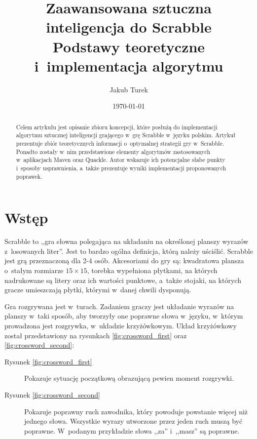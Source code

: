 \documentclass[a4paper,twocolumn,12pt]{article}
\title{\LARGE{Zaawansowana sztuczna inteligencja do Scrabble} \\ \vspace{2mm} \large{Podstawy teoretyczne i~implementacja algorytmu}}
\author{Jakub Turek}
\date{\today}
\theoremstyle{definition}
\begin{document}
\maketitle

\begin{abstract}
Celem artykułu jest opisanie zbioru koncepcji, które posłużą do implementacji algorytmu sztucznej inteligencji grającego w~grę Scrabble w~języku polskim. Artykuł prezentuje zbiór teoretycznych informacji o~optymalnej strategii gry w~Scrabble. Ponadto zostały w~nim przedstawione elementy algorytmów zastosowanych w~aplikacjach Maven oraz Quackle. Autor wskazuje ich potencjalne słabe punkty i~sposoby usprawnienia, a~także prezentuje wyniki implementacji proponowanych poprawek.
\end{abstract}

\section*{Wstęp}

Scrabble to ,,gra słowna polegająca na układaniu na określonej planszy wyrazów z~losowanych liter''. \cite{scrabble_definition} Jest to bardzo ogólna definicja, którą należy uściślić. Scrabble jest grą przeznaczoną dla 2-4 osób. Akcesoriami do gry są: kwadratowa plansza o~stałym rozmiarze $15 \times 15$, torebka wypełniona płytkami, na których nadrukowane są litery oraz ich wartości punktowe, a~także stojaki, na których gracze umieszczają płytki, którymi w~danej chwili dysponują.

Gra rozgrywana jest w~turach. Zadaniem graczy jest układanie wyrazów na planszy w~taki sposób, aby tworzyły one poprawne słowa w~języku, w~którym prowadzona jest rozgrywka, w~układzie krzyżówkowym. Układ krzyżówkowy został przedstawiony na rysunkach \ref{fig:crossword_first} oraz \ref{fig:crossword_second}:

\begin{description}
 \item [Rysunek \ref{fig:crossword_first}] Pokazuje sytuację początkową obrazującą pewien moment rozgrywki.
 \item [Rysunek \ref{fig:crossword_second}] Pokazuje poprawny ruch zawodnika, który powoduje powstanie więcej niż jednego słowa. Wszystkie wyrazy utworzone przez jeden ruch muszą być poprawne. W~podanym przykładzie słowa ,,za'' i~,,masz'' są poprawne.
\end{description}
\end{document}
